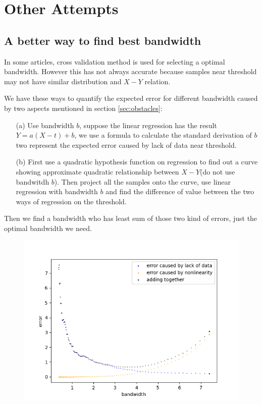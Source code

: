 \documentclass[a4 paper,12pt]{article}
\begin{document}
\section{Other Attempts}
\subsection*{A better way to find best bandwidth}

In some articles, cross validation method is used for selecting a optimal bandwidth. However this has not always accurate because samples near threshold may not have similar distribution and $X-Y$ relation.

We have these ways to quantify the expected error for different bandwidth caused by two aspects mentioned in section \ref{sec:obstacles}:

\begin{enumerate}
   \item[(a)] Use bandwidth $b$, suppose the linear regression has the result $Y=a(X-t)+b$, we use a formula to calculate the standard derivation of $b$ two represent the expected error caused by lack of data near threshold.
   \item[(b)] First use a quadratic hypothesis function on regression to find out a curve showing approximate quadratic relationship between $X-Y$(do not use bandwitdh $b$). Then project all the samples onto the curve, use linear regression with bandwidth $b$ and find the difference of value between the two ways of regression on the threshold. 
\end{enumerate}

Then we find a bandwidth who has least sum of those two kind of errors, just the optimal bandwidth we need.

\begin{figure}[h]
	\centering
	\includegraphics[scale=1]{Figure_5.png}
\end{figure}
\end{document}
